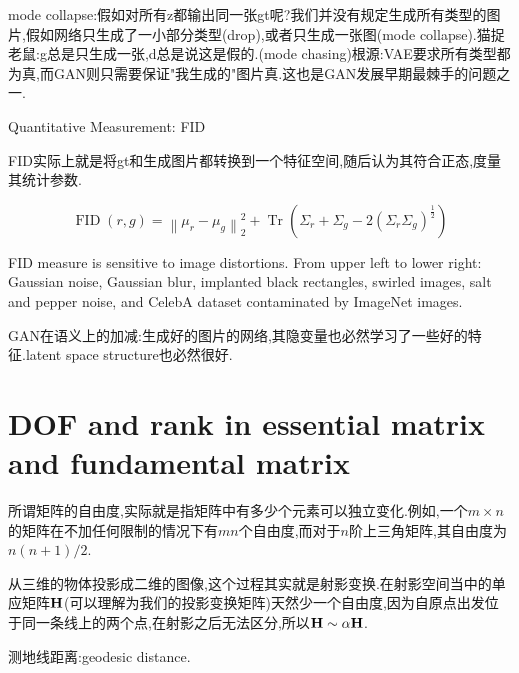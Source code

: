 	mode collapse:假如对所有z都输出同一张gt呢?我们并没有规定生成所有类型的图片,假如网络只生成了一小部分类型(drop),或者只生成一张图(mode collapse).猫捉老鼠:g总是只生成一张,d总是说这是假的.(mode chasing)根源:VAE要求所有类型都为真,而GAN则只需要保证"我生成的"图片真.这也是GAN发展早期最棘手的问题之一.
	
	Quantitative Measurement: FID
	
	FID实际上就是将gt和生成图片都转换到一个特征空间,随后认为其符合正态,度量其统计参数.
	
	\begin{equation}
		\operatorname{FID}(r, g)=\left\|\mu_{r}-\mu_{g}\right\|_{2}^{2}+\operatorname{Tr}\left(\Sigma_{r}+\Sigma_{g}-2\left(\Sigma_{r} \Sigma_{g}\right)^{\frac{1}{2}}\right)
	\end{equation}
	
	FID measure is sensitive to image distortions. From upper left to lower right: Gaussian noise, Gaussian blur, implanted black rectangles, swirled images, salt and pepper noise, and CelebA dataset contaminated by ImageNet images.
	
	GAN在语义上的加减:生成好的图片的网络,其隐变量也必然学习了一些好的特征.latent space structure也必然很好.
	
	\clearpage
	\appendix
	
	
	\clearpage
	\section{DOF and rank in essential matrix and fundamental matrix}
	\label{DOFandRank}
	所谓矩阵的自由度,实际就是指矩阵中有多少个元素可以独立变化.例如,一个$m \times n$的矩阵在不加任何限制的情况下有$mn$个自由度,而对于$n$阶上三角矩阵,其自由度为$n(n+1)/2$.
	
	从三维的物体投影成二维的图像,这个过程其实就是射影变换.在射影空间当中的单应矩阵$\bold{H}$(可以理解为我们的投影变换矩阵)天然少一个自由度,因为自原点出发位于同一条线上的两个点,在射影之后无法区分,所以$\bold{H} \sim \alpha \bold{H}$.
	
	测地线距离:geodesic distance.
	
	
	

    
    
